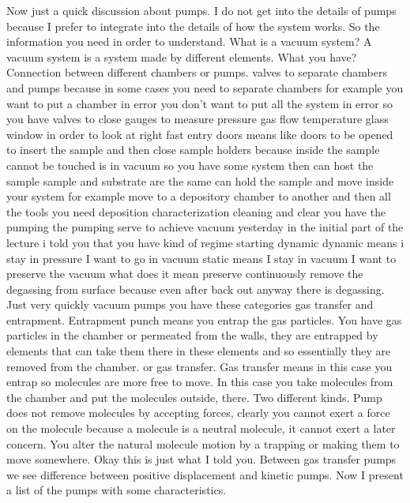 Now just a quick discussion about pumps. I do not get into the details of pumps because I prefer to integrate into the details of how the system works. So the information you need in order to understand. What is a vacuum system? A vacuum system is a system made by different elements. What you have? Connection between different chambers or pumps. valves to separate chambers and pumps because in some cases you need to separate chambers for example you want to put a chamber in error you don't want to put all the system in error so you have valves to close gauges to measure pressure gas flow temperature glass window in order to look at right fast entry doors means like doors to be opened to insert the sample and then close sample holders because inside the sample cannot be touched is in vacuum so you have some system then can host the sample sample and substrate are the same can hold the sample and move inside your system for example move to a depository chamber to another and then all the tools you need deposition characterization cleaning and clear you have the pumping the pumping serve to achieve vacuum yesterday in the initial part of the lecture i told you that you have kind of regime starting dynamic dynamic means i stay in pressure I want to go in vacuum static means I stay in vacuum I want to preserve the vacuum what does it mean preserve continuously remove the degassing from surface because even after back out anyway there is degassing.
Just very quickly vacuum pumps you have these categories gas transfer and entrapment. Entrapment punch means you entrap the gas particles. You have gas particles in the chamber or permeated from the walls, they are entrapped by elements that can take them there in these elements and so essentially they are removed from the chamber. or gas transfer. Gas transfer means in this case you entrap so molecules are more free to move. In this case you take molecules from the chamber and put the molecules outside, there. Two different kinds. Pump does not remove molecules by accepting forces, clearly you cannot exert a force on the molecule because a molecule is a neutral molecule, it cannot exert a later concern. You alter the natural molecule motion by a trapping or making them to move somewhere. Okay this is just what I told you. Between gas transfer pumps we see difference between positive displacement and kinetic pumps. Now I present a list of the pumps with some characteristics.
